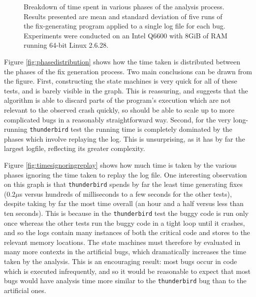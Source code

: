 \documentclass[10pt,twocolumn,preprint,natbib,authoryear]{sigplanconf}
\newcommand{\editorial}[1]{}
\begin{document}
\begin{figure*}
\hspace{10mm} 
\caption{Breakdown of time spent in various phases of the analysis
  process.  Results presented are mean and standard deviation of five
  runs of the fix-generating program applied to a single log file for
  each bug.  Experiments were conducted on an Intel Q6600 with 8GiB of
  RAM running 64-bit Linux 2.6.28.}
\end{figure*}

Figure \ref{fig:phasedistribution} shows how the time taken is
distributed between the phases of the fix generation process.  Two
main conclusions can be drawn from the figure.  First, constructing
the state machines is very quick for all of these tests, and is barely
visible in the graph.  This is reassuring, and suggests that the
algorithm is able to discard parts of the program's execution which
are not relevant to the observed crash quickly, so should be able to
scale up to more complicated bugs in a reasonably straightforward
way\editorial{Not sure I believe that}.  Second, for the very
long-running \verb|thunderbird| test the running time is completely
dominated by the phases which involve replaying the log.  This is
unsurprising, as it has by far the largest logfile, reflecting its
greater complexity.

Figure \ref{fig:timesignoringreplay} shows how much time is taken by
the various phases ignoring the time taken to replay the log file.
One interesting observation on this graph is that \verb|thunderbird|
spends by far the least time generating fixes (0.2$\mu{}$s versus
hundreds of milliseconds to a few seconds for the other tests),
despite taking by far the most time overall (an hour and a half versus
less than ten seconds).  This is because in the \verb|thunderbird|
test the buggy code is run only once whereas the other tests run the
buggy code in a tight loop until it crashes, and so the logs contain
many instances of both the critical code and stores to the relevant
memory locations.  The state machines must therefore by evaluated in
many more contexts in the artificial bugs, which dramatically
increases the time taken by the analysis.  This is an encouraging
result: most bugs occur in code which is executed infrequently, and so
it would be reasonable to expect that most bugs would have analysis
time more similar to the \verb|thunderbird| bug than to the artificial
ones.
\end{document}
